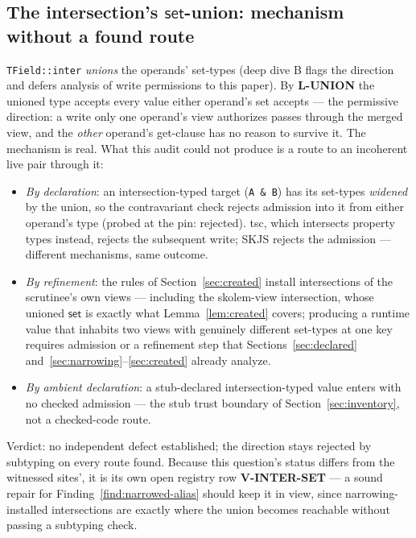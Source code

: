 \documentclass[11pt]{article}
\begin{document}
\subsection{The intersection's $\mathsf{set}$-union: mechanism without a
found route}
\label{sec:inter-set}

\texttt{TField::inter} \emph{unions} the operands' set-types (deep dive
B flags the direction and defers analysis of write permissions to this paper). By
\textbf{L-UNION} the unioned type accepts every value either operand's
set accepts — the permissive direction: a write only one operand's view
authorizes passes through the merged view, and the \emph{other}
operand's get-clause has no reason to survive it. The mechanism is
real. What this audit could not produce is a route to an incoherent
live pair through it:

\begin{itemize}
\item \emph{By declaration}: an intersection-typed target
  (\texttt{A \& B}) has its set-types \emph{widened} by the union, so
  the contravariant check rejects admission into it from either
  operand's type (probed at the pin: rejected). tsc, which intersects
  property types instead, rejects the subsequent write; SKJS rejects
  the admission — different mechanisms, same outcome.
\item \emph{By refinement}: the rules of Section~\ref{sec:created}
  install intersections of the scrutinee's own views — including the
  skolem-view intersection, whose unioned $\mathsf{set}$ is exactly
  what Lemma~\ref{lem:created} covers; producing a runtime value that
  inhabits two views with genuinely different set-types at one key
  requires admission or a refinement step that Sections~\ref{sec:declared}
  and~\ref{sec:narrowing}--\ref{sec:created} already analyze.
\item \emph{By ambient declaration}: a stub-declared intersection-typed
  value enters with no checked admission — the stub trust boundary of
  Section~\ref{sec:inventory}, not a checked-code route.
\end{itemize}

Verdict: no independent defect established; the direction stays
rejected by subtyping on every route found. Because this question's
status differs from the witnessed sites', it is its own open registry row
\textbf{V-INTER-SET} — a sound repair for
Finding~\ref{find:narrowed-alias} should keep it in view, since
narrowing-installed intersections are exactly where the union becomes
reachable without passing a subtyping check.
\end{document}
